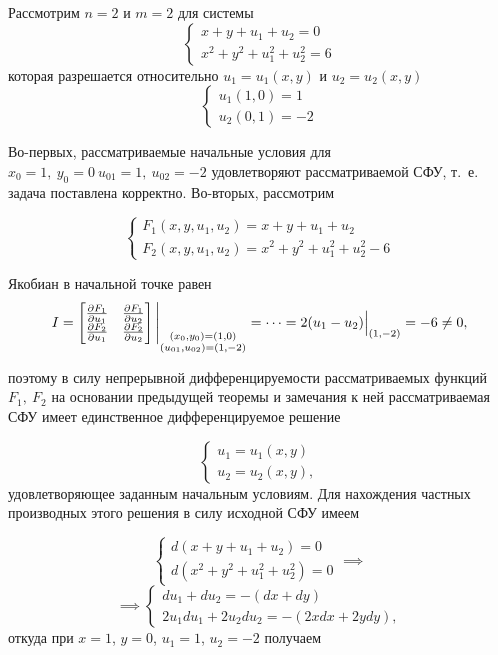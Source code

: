 \documentclass[../../main.tex]{subfiles}
\begin{document}
\begin{exmp}
    Рассмотрим $n = 2$ и $m = 2$ для системы
    \[
    \begin{cases}
        x + y + u_1 + u_2 = 0 \\
        x^2 + y^2 + u_1^2 + u_2^2 = 6
    \end{cases}
    \]
    которая разрешается относительно 
    $u_1 = u_1\left(x, y\right)$ и 
    $u_2 = u_2\left(x, y\right)$
    \[
    \begin{cases}
        u_1\left(1, 0\right) = 1\\
        u_2\left(0, 1\right) = -2
    \end{cases}
    \]
    
    Во-первых, рассматриваемые начальные условия для
    $x_0 = 1,\ y_0=0\ u_{01} = 1,\ u_{02} = -2$
    удовлетворяют рассматриваемой СФУ, т.~е. задача 
    поставлена корректно.
    Во-вторых, рассмотрим
    
    \[
    \begin{cases}
        F_1(x, y, u_1, u_2) = x + y + u_1 + u_2 \\
        F_2(x, y, u_1, u_2) = x^2 + y^2 + u_1^2 + u_2^2 - 6
    \end{cases}     
    \]
    
    Якобиан в начальной точке равен 
    \[
    I = \begin{bmatrix}
        \frac{\partial F_1}{\partial u_1} & \frac{\partial F_1}{\partial u_2} \\
        \frac{\partial F_2}{\partial u_1} & \frac{\partial F_2}{\partial u_2}
    \end{bmatrix}
    \Bigg|_{
    	\substack{
    		(x_0,y_0) = (1,0)\\
    		(u_{01},u_{02}) = (1,-2)
    	}} = \dots =  2(u_1 - u_2) \Big|_{(1, -2)} = -6 \neq 0,
    \]
    
    поэтому в силу непрерывной дифференцируемости рассматриваемых
    функций $F_1,\ F_2$ на основании
    предыдущей теоремы и замечания к ней 
    рассматриваемая СФУ имеет единственное 
    дифференцируемое решение
    
    \[
    \begin{cases}
        u_1 = u_1\left(x, y\right) \\
        u_2 = u_2\left(x, y\right), 
    \end{cases} 
    \]
    удовлетворяющее заданным начальным условиям.
    Для нахождения частных производных этого решения 
    в силу исходной СФУ имеем
    
    \[
    \begin{cases}
        d\left(x + y + u_1 + u_2\right) = 0 \\
        d\left(x^2 + y^2 + u_1^2 + u_2^2\right) = 0
    \end{cases} \implies
    \]
    \[
    \implies
    \begin{cases}
        du_1 + du_2 = -\left(dx + dy\right)\\
        2u_1du_1 + 2u_2du_2 = -\left(2xdx + 2ydy\right),
    \end{cases}
    \]
    откуда при $x = 1$, $y = 0$, $u_1 = 1$, $u_2 = -2$
    получаем
    

\end{exmp}
\end{document}
